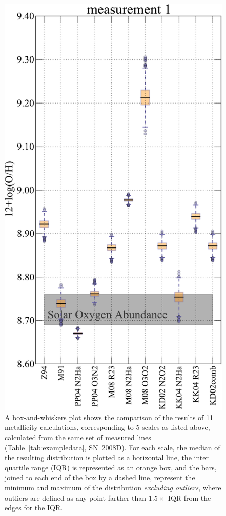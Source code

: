 \documentclass{emulateapj}
\begin{document}
\begin{figure}[ht!]
  \includegraphics[width=0.95\columnwidth]{exampledata_boxplot2000_m1.pdf}
   \caption{A box-and-whiskers plot shows the comparison of the results of 11 metallicity calculations, corresponding to 5 scales as listed above, calculated from the same set of measured lines (Table~\ref{tab:exampledata}, SN~2008D). For each scale, the median of the resulting distribution is plotted as a horizontal line, the inter quartile range (IQR) is represented as an orange box, and the bars, joined to each end of the box by a dashed line, represent the minimum and maximum of the distribution \emph{excluding outliers}, where outliers are defined as any point farther than $1.5\times$ IQR from the edges for the IQR.}
 \label{boxplot}
\end{figure}
\end{document}
